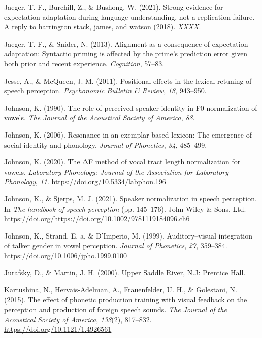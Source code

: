 \documentclass[
  11pt,
  english,
  man,floatsintext]{apa6}
\newlength{\cslhangindent}
\newlength{\cslentryspacingunit} %
\newenvironment{CSLReferences}[2] %
 {%
  \setlength{\parindent}{0pt}
  \ifodd #1
  \let\oldpar\par
  \def\par{\hangindent=\cslhangindent\oldpar}
  \fi
  \setlength{\parskip}{#2\cslentryspacingunit}
 }%
 {}
\begin{document}
\begin{CSLReferences}{1}{0}
\leavevmode{}%
Jaeger, T. F., Burchill, Z., \& Bushong, W. (2021). Strong evidence for expectation adaptation during language understanding, not a replication failure. A reply to harrington stack, james, and watson (2018). \emph{XXXX}.

\leavevmode{}%
Jaeger, T. F., \& Snider, N. (2013). Alignment as a consequence of expectation adaptation: Syntactic priming is affected by the prime's prediction error given both prior and recent experience. \emph{Cognition}, 57--83.

\leavevmode{}%
Jesse, A., \& McQueen, J. M. (2011). Positional effects in the lexical retuning of speech perception. \emph{Psychonomic Bulletin \& Review}, \emph{18}, 943--950.

\leavevmode{}%
Johnson, K. (1990). The role of perceived speaker identity in F0 normalization of vowels. \emph{The Journal of the Acoustical Society of America}, \emph{88}.

\leavevmode{}%
Johnson, K. (2006). Resonance in an exemplar-based lexicon: The emergence of social identity and phonology. \emph{Journal of Phonetics}, \emph{34}, 485--499.

\leavevmode{}%
Johnson, K. (2020). The ΔF method of vocal tract length normalization for vowels. \emph{Laboratory Phonology: Journal of the Association for Laboratory Phonology}, \emph{11}. \url{https://doi.org/10.5334/labphon.196}

\leavevmode{}%
Johnson, K., \& Sjerps, M. J. (2021). Speaker normalization in speech perception. In \emph{The handbook of speech perception} (pp. 145--176). John Wiley \& Sons, Ltd. https://doi.org/\url{https://doi.org/10.1002/9781119184096.ch6}

\leavevmode{}%
Johnson, K., Strand, E. a, \& D'Imperio, M. (1999). Auditory--visual integration of talker gender in vowel perception. \emph{Journal of Phonetics}, \emph{27}, 359--384. \url{https://doi.org/10.1006/jpho.1999.0100}

\leavevmode{}%
Jurafsky, D., \& Martin, J. H. (2000). Upper Saddle River, N.J: Prentice Hall.

\leavevmode{}%
Kartushina, N., Hervais-Adelman, A., Frauenfelder, U. H., \& Golestani, N. (2015). The effect of phonetic production training with visual feedback on the perception and production of foreign speech sounds. \emph{The Journal of the Acoustical Society of America}, \emph{138}(2), 817--832. \url{https://doi.org/10.1121/1.4926561}


\end{CSLReferences}
\end{document}
